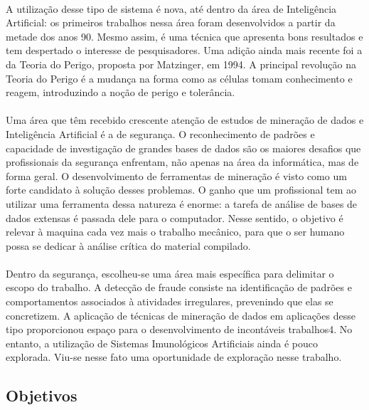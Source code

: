 \documentclass{article}
\begin{document}
\paragraph{}A utilização desse tipo de sistema é nova, até dentro da área de Inteligência Artificial: os primeiros trabalhos nessa área foram desenvolvidos a partir da metade dos anos 90. Mesmo assim, é uma técnica que apresenta bons resultados e tem despertado o interesse de pesquisadores. Uma adição ainda mais recente foi a da Teoria do Perigo, proposta por Matzinger, em 1994. A principal revolução na Teoria do Perigo é a mudança na forma como as células tomam conhecimento e reagem, introduzindo a noção de perigo e tolerância.

\paragraph{}Uma área que têm recebido crescente atenção de estudos de mineração de dados e Inteligência Artificial é a de segurança. O reconhecimento de padrões e capacidade de investigação de grandes bases de dados são os maiores desafios que profissionais da segurança enfrentam, não apenas na área da informática, mas de forma geral. O desenvolvimento de ferramentas de mineração é visto como um forte candidato à solução desses problemas. O ganho que um profissional tem ao utilizar uma ferramenta dessa natureza é enorme: a tarefa de análise de bases de dados extensas é passada dele para o computador. Nesse sentido, o objetivo é relevar à maquina cada vez mais o trabalho mecânico, para que o ser humano possa se dedicar à análise crítica do material compilado.

\paragraph{}Dentro da segurança, escolheu-se uma área mais específica para delimitar o escopo do trabalho. A detecção de fraude consiste na identificação de padrões e comportamentos associados à atividades irregulares, prevenindo que elas se concretizem. A aplicação de técnicas de mineração de dados em aplicações desse tipo proporcionou espaço para o desenvolvimento de incontáveis trabalhos4. No entanto, a utilização de Sistemas Imunológicos Artificiais ainda é pouco explorada. Viu-se nesse fato uma oportunidade de exploração nesse trabalho.

\subsection{Objetivos}
\end{document}

